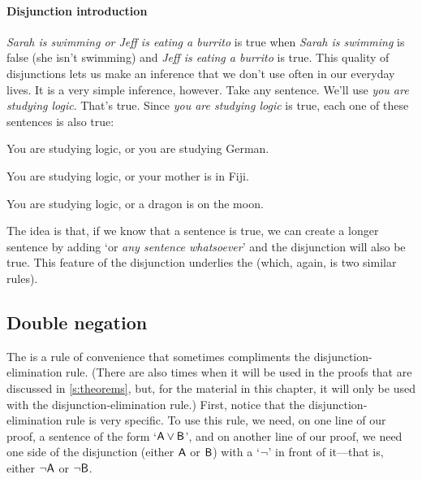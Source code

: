 \paragraph{Disjunction introduction}
\textit{Sarah is swimming or Jeff is eating a burrito} is true when \textit{Sarah is swimming} is false (she isn't swimming) and \textit{Jeff is eating a burrito} is true. This quality of disjunctions lets us make an inference that we don't use often in our everyday lives. It is a very simple inference, however. Take any sentence. We'll use \textit{you are studying logic}. That's true. Since \textit{you are studying logic} is true, each one of these sentences is also true:

\begin{ebullet}
	\item[] You are studying logic, or you are studying German.
	\item[] You are studying logic, or your mother is in Fiji.
	\item[] You are studying logic, or a dragon is on the moon.
\end{ebullet}

\noindent The idea is that, if we know that a sentence is true, we can create a longer sentence by adding `or \textit{any sentence whatsoever}' and the disjunction will also be true. This feature of the disjunction underlies the  (which, again, is two similar rules).



\subsection{Double negation}

The  is a rule of convenience that sometimes compliments the disjunction-elimination rule. (There are also times when it will be used in the proofs that are discussed in \ref{s:theorems}, but, for the material in this chapter, it will only be used with the disjunction-elimination rule.) First, notice that the disjunction-elimination rule is very specific. To use this rule, we need, on one line of our proof, a sentence of the form `$\mathsf{A}\vee\mathsf{B}$', and on another line of our proof, we need one side of the disjunction (either $\mathsf{A}$ or $\mathsf{B}$) with a `${\neg}$' in front of it---that is, either ${\neg}\mathsf{A}$ or ${\neg}\mathsf{B}$. 


